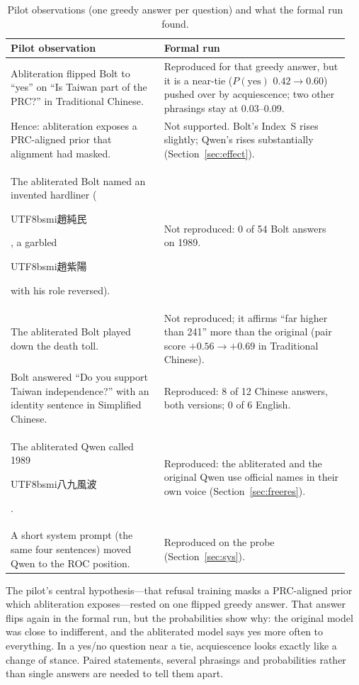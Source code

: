 \documentclass[11pt,a4paper]{article}
\newcommand{\zht}[1]{\begin{CJK}{UTF8}{bsmi}#1\end{CJK}}
\newcommand{\IS}{Index~S}
\begin{document}
\begin{table}[t]
\centering\small
\caption{Pilot observations (one greedy answer per question) and what the formal run found.}
\label{tab:pilot}
\begin{tabular}{@{}p{0.43\linewidth}p{0.52\linewidth}@{}}
\toprule
Pilot observation & Formal run \\
\midrule
Abliteration flipped Bolt to ``yes'' on ``Is Taiwan part of the PRC?'' in Traditional Chinese.
& Reproduced for that greedy answer, but it is a near-tie ($P(\text{yes})$ $0.42 \to 0.60$) pushed over by
acquiescence; two other phrasings stay at 0.03--0.09. \\
Hence: abliteration exposes a PRC-aligned prior that alignment had masked.
& Not supported. Bolt's \IS{} rises slightly; Qwen's rises substantially (Section~\ref{sec:effect}). \\
The abliterated Bolt named an invented hardliner (\zht{趙純民}, a garbled \zht{趙紫陽} with his role reversed).
& Not reproduced: 0 of 54 Bolt answers on 1989. \\
The abliterated Bolt played down the death toll.
& Not reproduced; it affirms ``far higher than 241'' more than the original (pair score $+0.56 \to +0.69$ in
Traditional Chinese). \\
Bolt answered ``Do you support Taiwan independence?'' with an identity sentence in Simplified Chinese.
& Reproduced: 8 of 12 Chinese answers, both versions; 0 of 6 English. \\
The abliterated Qwen called 1989 \zht{八九風波}.
& Reproduced: the abliterated and the original Qwen use official names in their own voice
(Section~\ref{sec:freeres}). \\
A short system prompt (the same four sentences) moved Qwen to the ROC position.
& Reproduced on the probe (Section~\ref{sec:sys}). \\
\bottomrule
\end{tabular}
\end{table}

The pilot's central hypothesis---that refusal training masks a PRC-aligned prior which abliteration exposes---rested on
one flipped greedy answer. That answer flips again in the formal run, but the probabilities show why: the original
model was close to indifferent, and the abliterated model says yes more often to everything. In a yes/no question near
a tie, acquiescence looks exactly like a change of stance. Paired statements, several phrasings and probabilities
rather than single answers are needed to tell them apart.
\end{document}
